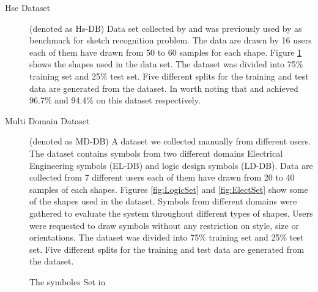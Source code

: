 \begin{description}
	\item [Hse Dataset] (denoted as Hs-DB) Data set collected by \cite{HeloiseBeautification} and was previously used by \cite{Oltmans07} as benchmark for sketch recognition problem. The data are drawn by 16 users each of them have drawn from 50 to 60 samples for each shape. Figure \ref{fig:symbolSet} shows the shapes used in the data set. The dataset was divided into 75\% training set and 25\% test set. Five different splits for the training and test data are generated from the dataset. In worth noting that \cite{HeloiseBeautification} and \cite{Oltmans07} achieved 96.7\% and  94.4\%  on this dataset respectively. %
		\item [Multi Domain Dataset] (denoted as MD-DB) A dataset we collected manually from different users. The dataset contains symbols from two different domains Electrical Engineering symbols (EL-DB) and logic design symbols (LD-DB). Data are collected from 7 different users each of them have drawn from 20 to 40 samples of each shapes. Figures \ref{fig:LogicSet} and \ref{fig:ElectSet} show some of the shapes used in the dataset. Symbols from different domains were gathered to evaluate the system throughout different types of shapes. Users were requested to draw symbols without any restriction on style, size or orientations. The dataset was divided into 75\% training set and 25\% test set. Five different splits for the training and test data are generated from the dataset. %
\end{description}

\begin{figure}[]\centering
{}
	\caption[Hs-DB Symbol Set]{The symboles Set in \cite{HeloiseBeautification} } 
	\label{fig:symbolSet}
\end{figure}

